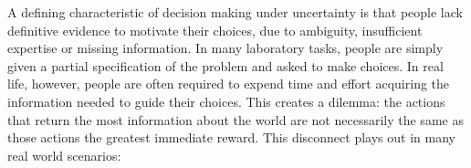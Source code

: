 \documentclass[authoryear]{elsarticle}
\begin{document}


A defining characteristic of decision making under uncertainty is that people  lack definitive evidence to motivate their choices, due to ambiguity, insufficient expertise or missing information. In many laboratory tasks, people are simply given a partial specification of the problem and asked to make choices. In real life, however, people are often required to expend time and effort acquiring the information needed to guide their choices. This creates a dilemma: the actions that return the most information about the world are not necessarily the same as those actions the greatest immediate reward. This disconnect plays out in many real world scenarios:
\end{document}
